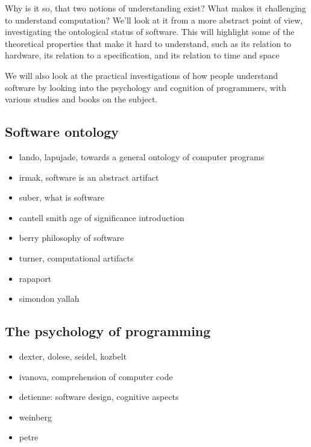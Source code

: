 Why is it so, that two notions of understanding exist? What makes it challenging to understand computation? We'll look at it from a more abstract point of view, investigating the ontological status of software. This will highlight some of the theoretical properties that make it hard to understand, such as its relation to hardware, its relation to a specification, and its relation to time and space

We will also look at the practical investigations of how people understand software by looking into the psychology and cognition of programmers, with various studies and books on the subject.


\subsection{Software ontology}

\begin{itemize}
    \item lando, lapujade, towards a general ontology of computer programs
    \item irmak, software is an abstract artifact
    \item suber, what is software
    \item cantell smith age of significance introduction
    \item berry philosophy of software
    \item turner, computational artifacts
    \item rapaport
    \item simondon yallah
\end{itemize}

\subsection{The psychology of programming}

\begin{itemize}
    \item dexter, dolese, seidel, kozbelt
    \item ivanova, comprehension of computer code
    \item detienne: software design, cognitive aspects
    \item weinberg
    \item petre
\end{itemize}

